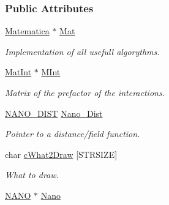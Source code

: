 \subsubsection*{Public Attributes}
\begin{DoxyCompactItemize}
\item 
\hyperlink{classMatematica}{Matematica} $\ast$ \hyperlink{classVarData_aab4995eedc5bb0d45d86f0e2a5d0e869}{Mat}\hypertarget{classVarData_aab4995eedc5bb0d45d86f0e2a5d0e869}{}\label{classVarData_aab4995eedc5bb0d45d86f0e2a5d0e869}

\begin{DoxyCompactList}\small\item\em Implementation of all usefull algorythms. \end{DoxyCompactList}\item 
\hyperlink{classMatInt}{Mat\+Int} $\ast$ \hyperlink{classVarData_a7bb96647a8e4b53477394d2538fdfb3f}{M\+Int}\hypertarget{classVarData_a7bb96647a8e4b53477394d2538fdfb3f}{}\label{classVarData_a7bb96647a8e4b53477394d2538fdfb3f}

\begin{DoxyCompactList}\small\item\em Matrix of the prefactor of the interactions. \end{DoxyCompactList}\item 
\hyperlink{classVarData_adbdcbdf95f57b050f2d42371980f2c89}{N\+A\+N\+O\+\_\+\+D\+I\+ST} \hyperlink{classVarData_a5272af22ca77a745a6e86cd6b4f23ccf}{Nano\+\_\+\+Dist}\hypertarget{classVarData_a5272af22ca77a745a6e86cd6b4f23ccf}{}\label{classVarData_a5272af22ca77a745a6e86cd6b4f23ccf}

\begin{DoxyCompactList}\small\item\em Pointer to a distance/field function. \end{DoxyCompactList}\item 
char \hyperlink{classVarData_a7c997cd3acaf56afc44e01680323eb0e}{c\+What2\+Draw} \mbox{[}S\+T\+R\+S\+I\+ZE\mbox{]}\hypertarget{classVarData_a7c997cd3acaf56afc44e01680323eb0e}{}\label{classVarData_a7c997cd3acaf56afc44e01680323eb0e}

\begin{DoxyCompactList}\small\item\em What to draw. \end{DoxyCompactList}\item 
\hyperlink{structNANO}{N\+A\+NO} $\ast$ \hyperlink{classVarData_aee5ea3e3c08ea9745e40192350f5d14b}{Nano}\hypertarget{classVarData_aee5ea3e3c08ea9745e40192350f5d14b}{}\label{classVarData_aee5ea3e3c08ea9745e40192350f5d14b}


\end{DoxyCompactItemize}
